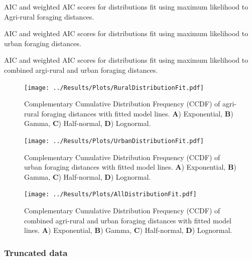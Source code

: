 \documentclass[11pt,usenames,dvipsnames,a4paper]{article}
\begin{document}
\begin{table}[H]
	\centering
	\caption{AIC and weighted AIC scores for distributions fit using maximum likelihood to Agri-rural foraging distances.}
	
\end{table}
\begin{table}[H]
	\centering
	\caption{AIC and weighted AIC scores for distributions fit using maximum likelihood to urban foraging distances.}
	
\end{table}
\begin{table}[H]
	\centering
	\caption{AIC and weighted AIC scores for distributions fit using maximum likelihood to combined argi-rural and urban foraging distances.}
	
\end{table}

\begin{figure}[H]
	\centering
	\texttt{[image: ../Results/Plots/RuralDistributionFit.pdf]}
	\caption{Complementary Cumulative Distribution Frequency (CCDF) of agri-rural foraging distances with fitted model lines. \textbf{A}) Exponential, \textbf{B}) Gamma, \textbf{C}) Half-normal, \textbf{D}) Lognormal.}
\end{figure}

\begin{figure}[H]
	\centering
	\texttt{[image: ../Results/Plots/UrbanDistributionFit.pdf]}
	\caption{Complementary Cumulative Distribution Frequency (CCDF) of urban foraging distances with fitted model lines. \textbf{A}) Exponential, \textbf{B}) Gamma, \textbf{C}) Half-normal, \textbf{D}) Lognormal.}
\end{figure}

\begin{figure}[H]
	\centering
	\texttt{[image: ../Results/Plots/AllDistributionFit.pdf]}
	\caption{Complementary Cumulative Distribution Frequency (CCDF) of combined agri-rural and urban foraging distances with fitted model lines. \textbf{A}) Exponential, \textbf{B}) Gamma, \textbf{C}) Half-normal, \textbf{D}) Lognormal.}
\end{figure}

\subsubsection{Truncated data}
\end{document}
